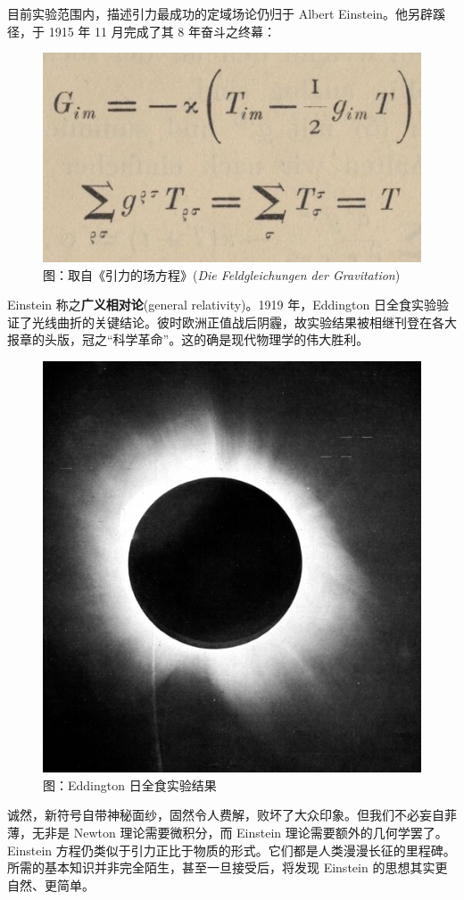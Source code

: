 目前实验范围内，描述引力最成功的定域场论仍归于 Albert Einstein。他另辟蹊径，于 1915 年 11 月完成了其 8 年奋斗之终幕：
\begin{figure}[ht]
    \centering
    \includegraphics[scale=0.3]{fig/equation.jpeg}
    \caption*{\small 图：取自《引力的场方程》(\textit{Die Feldgleichungen der Gravitation})}
\end{figure}

\noindent Einstein 称之\textbf{广义相对论}(general relativity)。1919 年，Eddington 日全食实验验证了光线曲折的关键结论。彼时欧洲正值战后阴霾，故实验结果被相继刊登在各大报章的头版，冠之“科学革命”。这的确是现代物理学的伟大胜利。
\begin{figure}[ht]
    \centering
    \includegraphics[scale=0.35]{fig/1919_eclipse_positive.jpg}
    \caption*{\small 图：Eddington 日全食实验结果}
\end{figure}
诚然，新符号自带神秘面纱，固然令人费解，败坏了大众印象。但我们不必妄自菲薄，无非是 Newton 理论需要微积分，而 Einstein 理论需要额外的几何学罢了。Einstein 方程仍类似于引力正比于物质的形式。它们都是人类漫漫长征的里程碑。所需的基本知识并非完全陌生，甚至一旦接受后，将发现 Einstein 的思想其实更自然、更简单。

